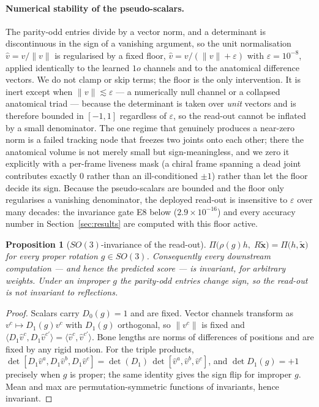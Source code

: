 \documentclass[10pt,journal]{IEEEtran}
\newtheorem{proposition}{Proposition}
\begin{document}
\paragraph{Numerical stability of the pseudo-scalars.} The parity-odd entries divide by a vector
norm, and a determinant is discontinuous in the sign of a vanishing argument, so the unit
normalisation $\hat v=v/\|v\|$ is regularised by a fixed floor,
$\hat v=v/(\|v\|+\varepsilon)$ with $\varepsilon=10^{-8}$, applied identically to the learned $1o$
channels and to the anatomical difference vectors. We do not clamp or skip terms; the floor is the
only intervention. It is inert except when $\|v\|\lesssim\varepsilon$ --- a numerically null channel
or a collapsed anatomical triad --- because the determinant is taken over \emph{unit} vectors and is
therefore bounded in $[-1,1]$ regardless of $\varepsilon$, so the read-out cannot be inflated by a
small denominator. The one regime that genuinely produces a near-zero norm is a failed tracking node
that freezes two joints onto each other; there the anatomical volume is not merely small but
sign-meaningless, and we zero it explicitly with a per-frame liveness mask (a chiral frame spanning a
dead joint contributes exactly $0$ rather than an ill-conditioned $\pm1$) rather than let the floor
decide its sign. Because the pseudo-scalars are bounded and the floor only regularises a vanishing
denominator, the deployed read-out is insensitive to $\varepsilon$ over many decades: the invariance
gate E8 below ($2.9\times10^{-16}$) and every accuracy number in Section~\ref{sec:results} are computed
with this floor active.

\begin{proposition}[$SO(3)$-invariance of the read-out]
\label{prop:invariance}
$\Pi\big(\rho(g)h,\;R\tilde{\bm{x}}\big)=\Pi\big(h,\tilde{\bm{x}}\big)$ for every proper rotation
$g\in SO(3)$. Consequently every downstream computation --- and hence the predicted score --- is
invariant, \emph{for arbitrary weights}. Under an improper $g$ the parity-odd entries change sign, so
the read-out is \emph{not} invariant to reflections.
\end{proposition}
\begin{proof}
Scalars carry $D_0(g)=1$ and are fixed. Vector channels transform as $v^c\mapsto D_1(g)v^c$ with
$D_1(g)$ orthogonal, so $\|v^c\|$ is fixed and
$\langle D_1 \hat v^{c}, D_1 \hat v^{c'}\rangle=\langle \hat v^{c},\hat v^{c'}\rangle$. Bone lengths
are norms of differences of positions and are fixed by any rigid motion. For the triple products,
$\det[D_1\hat v^{a},D_1\hat v^{b},D_1\hat v^{c}]=\det(D_1)\,\det[\hat v^{a},\hat v^{b},\hat v^{c}]$,
and $\det D_1(g)=+1$ precisely when $g$ is proper; the same identity gives the sign flip for improper
$g$. Mean and max are permutation-symmetric functions of invariants, hence invariant.
\end{proof}
\end{document}
